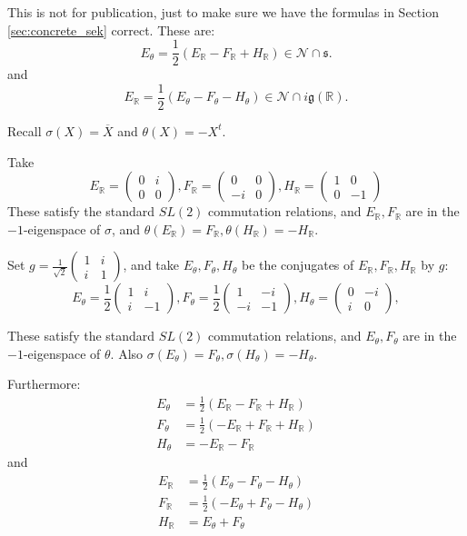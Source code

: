 \documentclass[10pt,leqno]{article}
\newcommand{\R}{\mathbb R}
\newcommand{\N}{\mathcal N}
\newcommand{\g}{\mathfrak g}
\newcommand{\s}{\mathfrak s}
\begin{document}
This is not for publication, just to make sure we have the formulas in Section \ref{sec:concrete_sek} correct.
These are:
$$
E_\theta=\frac12(E_\R-F_\R+H_\R)\in \N\cap \s.
$$
and
$$
E_\R=\frac 12(E_\theta-F_\theta-H_\theta)\in\N\cap i\g(\R).
$$

Recall $\sigma(X)=\overline X$ and $\theta(X)=-X^t$.

Take
$$
E_\R=\begin{pmatrix}0&i\\0&0\end{pmatrix},
F_\R=\begin{pmatrix}0&0\\-i&0\end{pmatrix},
H_\R=\begin{pmatrix}1&0\\0&-1\end{pmatrix}
$$
These satisfy the standard $SL(2)$ commutation relations, and $E_\R,F_\R$ are in the $-1$-eigenspace of $\sigma$,
and $\theta(E_\R)=F_\R, \theta(H_\R)=-H_\R$.

Set $g=\frac 1{\sqrt 2}\begin{pmatrix}1&i\\i&1
\end{pmatrix}$, and take $E_\theta,F_\theta,H_\theta$ be the conjugates of $E_\R,F_\R,H_\R$ by $g$:
$$
E_\theta=\frac12\begin{pmatrix}1&i\\i&-1\end{pmatrix},
F_\theta=\frac12\begin{pmatrix}1&-i\\-i&-1\end{pmatrix},
H_\theta=\begin{pmatrix}0&-i\\i&0\end{pmatrix},
$$


These satisfy the standard $SL(2)$ commutation relations, and $E_\theta,F_\theta$ are in the $-1$-eigenspace of $\theta$.
Also $\sigma(E_\theta)=F_\theta,\sigma(H_\theta)=-H_\theta$.

Furthermore:
$$
\begin{aligned}
  E_\theta&=\frac12(E_\R-F_\R+H_\R)\\
  F_\theta&=\frac12(-E_\R+F_\R+H_\R)\\
  H_\theta&=-E_\R-F_\R
\end{aligned}
$$
and
$$
\begin{aligned}
  E_\R&=\frac12(E_\theta-F_\theta-H_\theta)\\
  F_\R&=\frac12(-E_\theta+F_\theta-H_\theta)\\
  H_\R&=E_\theta+F_\theta
\end{aligned}
$$





\end{document}

